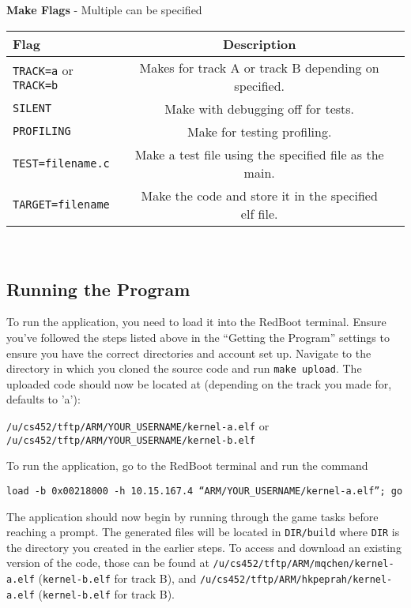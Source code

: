 \documentclass[12pt]{article}
\begin{document}
\begin{center}
  {\bf Make Flags} - Multiple can be specified
  \begin{tabular}{|l|c|c|}
    \hline
    {\bf Flag} & {\bf Description} \\\hline
    \texttt{TRACK=a} or \texttt{TRACK=b} & Makes for track A or track B depending on specified. \\\hline
    \texttt{SILENT} & Make with debugging off for tests. \\\hline
    \texttt{PROFILING} & Make for testing profiling. \\\hline
    \texttt{TEST=filename.c} & Make a test file using the specified file as the main. \\\hline
    \texttt{TARGET=filename} & Make the code and store it in the specified elf file. \\\hline
  \end{tabular}
\end{center}
\\[1\baselineskip]
\subsection{Running the Program}
To run the application, you need to load it into the RedBoot terminal.  Ensure you've followed the steps listed above in the ``Getting the Program'' settings to ensure you have the correct directories and account set up.  Navigate to the directory in which you cloned the source code and run \texttt{make upload}.  The uploaded code should now be located at (depending on the track you made for, defaults to 'a'):
\begin{center}
  \texttt{/u/cs452/tftp/ARM/YOUR\_USERNAME/kernel-a.elf} or \\
  \texttt{/u/cs452/tftp/ARM/YOUR\_USERNAME/kernel-b.elf}
\end{center}
To run the application, go to the RedBoot terminal and run the command
\begin{center}
  \texttt{load -b 0x00218000 -h 10.15.167.4 ``ARM/YOUR\_USERNAME/kernel-a.elf''; go}
\end{center}
The application should now begin by running through the game tasks before reaching a prompt.  The generated files will be located in \texttt{DIR/build} where \texttt{DIR} is the directory you created in the earlier steps.  To access and download an existing version of the code, those can be found at \texttt{/u/cs452/tftp/ARM/mqchen/kernel-a.elf} (\texttt{kernel-b.elf} for track B), and \texttt{/u/cs452/tftp/ARM/hkpeprah/kernel-a.elf} (\texttt{kernel-b.elf} for track B).
\\
\end{document}
